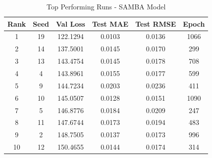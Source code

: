 \begin{table}[ht]
\centering
\caption{Top Performing Runs - SAMBA Model}
\label{tab:samba_results}
\begin{tabular}{cccccc}
\hline
\textbf{Rank} & \textbf{Seed} & \textbf{Val Loss} & \textbf{Test MAE} & \textbf{Test RMSE} & \textbf{Epoch} \\
\hline
1 & 19 & 122.1294 & 0.0103 & 0.0136 & 1066 \\
2 & 14 & 137.5001 & 0.0145 & 0.0170 & 299 \\
3 & 13 & 143.4754 & 0.0145 & 0.0178 & 708 \\
4 & 4 & 143.8961 & 0.0155 & 0.0177 & 599 \\
5 & 9 & 144.7234 & 0.0203 & 0.0236 & 411 \\
6 & 10 & 145.0507 & 0.0128 & 0.0151 & 1090 \\
7 & 5 & 146.8776 & 0.0184 & 0.0209 & 247 \\
8 & 11 & 147.6744 & 0.0173 & 0.0194 & 483 \\
9 & 2 & 148.7505 & 0.0137 & 0.0173 & 996 \\
10 & 12 & 150.4655 & 0.0144 & 0.0174 & 314 \\
\hline
\end{tabular}
\end{table}
